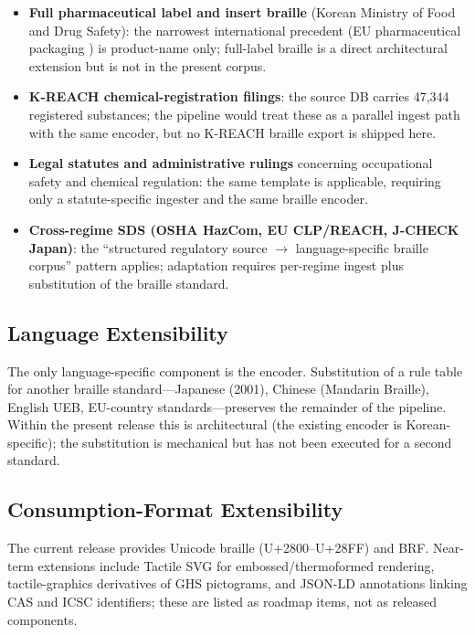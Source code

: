 \documentclass[journal]{IEEEtran}
\begin{document}
\begin{itemize}
\item \textbf{Full pharmaceutical label and insert braille} (Korean Ministry of Food and Drug Safety): the narrowest international precedent (EU pharmaceutical packaging \cite{eu_braille}) is product-name only; full-label braille is a direct architectural extension but is not in the present corpus.
\item \textbf{K-REACH chemical-registration filings}: the source DB carries 47{,}344 registered substances; the pipeline would treat these as a parallel ingest path with the same encoder, but no K-REACH braille export is shipped here.
\item \textbf{Legal statutes and administrative rulings} concerning occupational safety and chemical regulation: the same template is applicable, requiring only a statute-specific ingester and the same braille encoder.
\item \textbf{Cross-regime SDS (OSHA HazCom, EU CLP/REACH, J-CHECK Japan)}: the ``structured regulatory source $\rightarrow$ language-specific braille corpus'' pattern applies; adaptation requires per-regime ingest plus substitution of the braille standard.
\end{itemize}

\subsection{Language Extensibility}

The only language-specific component is the encoder. Substitution of a rule table for another braille standard---Japanese (2001), Chinese (Mandarin Braille), English UEB, EU-country standards---preserves the remainder of the pipeline. Within the present release this is architectural (the existing encoder is Korean-specific); the substitution is mechanical but has not been executed for a second standard.

\subsection{Consumption-Format Extensibility}

The current release provides Unicode braille (U+2800--U+28FF) and BRF. Near-term extensions include Tactile SVG for embossed/thermoformed rendering, tactile-graphics derivatives of GHS pictograms, and JSON-LD annotations linking CAS and ICSC identifiers; these are listed as roadmap items, not as released components.
\end{document}
